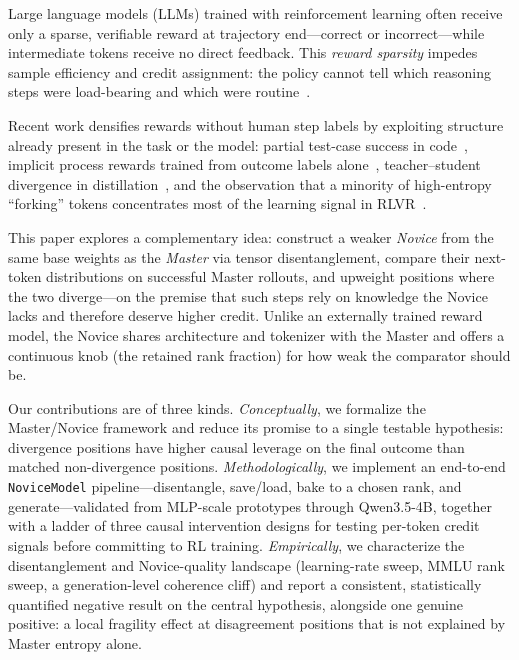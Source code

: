 \documentclass[times, 10pt,twocolumn]{article}
\begin{document}

Large language models (LLMs) trained with reinforcement learning often receive
only a sparse, verifiable reward at trajectory end---correct or
incorrect---while intermediate tokens receive no direct feedback. This
\emph{reward sparsity} impedes sample efficiency and credit assignment: the
policy cannot tell which reasoning steps were load-bearing and which were
routine~\cite{cui2025prime}.

Recent work densifies rewards without human step labels by exploiting structure
already present in the task or the model: partial test-case success in
code~\cite{wang2026verpo}, implicit process rewards trained from outcome labels
alone~\cite{cui2025prime}, teacher--student divergence in
distillation~\cite{xu2026tip}, and the observation that a minority of
high-entropy ``forking'' tokens concentrates most of the learning signal in
RLVR~\cite{wang2025forking}.

This paper explores a complementary idea: construct a weaker \emph{Novice} from
the same base weights as the \emph{Master} via tensor disentanglement, compare
their next-token distributions on successful Master rollouts, and upweight
positions where the two diverge---on the premise that such steps rely on
knowledge the Novice lacks and therefore deserve higher credit. Unlike an
externally trained reward model, the Novice shares architecture and tokenizer
with the Master and offers a continuous knob (the retained rank fraction) for
how weak the comparator should be.

Our contributions are of three kinds. \emph{Conceptually}, we formalize the
Master/Novice framework and reduce its promise to a single testable hypothesis:
divergence positions have higher causal leverage on the final outcome than
matched non-divergence positions. \emph{Methodologically}, we implement an
end-to-end \texttt{NoviceModel} pipeline---disentangle, save/load, bake to a
chosen rank, and generate---validated from MLP-scale prototypes through
Qwen3.5-4B, together with a ladder of three causal intervention designs for
testing per-token credit signals before committing to RL training.
\emph{Empirically}, we characterize the disentanglement and Novice-quality
landscape (learning-rate sweep, MMLU rank sweep, a generation-level coherence
cliff) and report a consistent, statistically quantified negative result on the
central hypothesis, alongside one genuine positive: a local fragility effect at
disagreement positions that is not explained by Master entropy alone.
\end{document}
